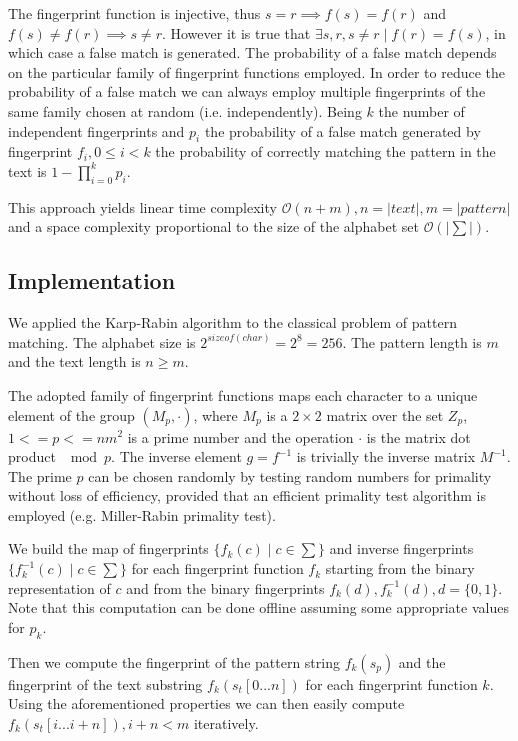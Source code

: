 \documentclass{article}
\begin{document}
The fingerprint function is injective, thus $s = r \implies f(s) = f(r)$ and $f(s) \ne f(r) \implies s \ne r$. However it is true that $\exists s, r, s \ne r \mid f(r) = f(s)$, in which case a false match is generated. The probability of a false match depends on the particular family of fingerprint functions employed. In order to reduce the probability of a false match we can always employ multiple fingerprints of the same family chosen at random (i.e. independently). Being $k$ the number of independent fingerprints and $p_i$ the probability of a false match generated by fingerprint $f_i, 0 \le i < k$ the probability of correctly matching the pattern in the text is $1 - \prod_{i = 0}^k p_i$.

This approach yields linear time complexity $\mathcal{O}(n + m), n = |text|, m = |pattern|$ and a space complexity proportional to the size of the alphabet set $\mathcal{O}(|\sum|)$.

\subsection{Implementation}
We applied the Karp-Rabin algorithm to the classical problem of pattern matching. The alphabet size is $2^{sizeof(char)} = 2^8 = 256$. The pattern length is $m$ and the text length is $n \ge m$.

The adopted family of fingerprint functions maps each character to a unique element of the group $(M_p, \cdot)$, where $M_p$ is a $2 \times 2$ matrix over the set $Z_p$, $1 <= p <= n m^2$ is a prime number and the operation $\cdot$ is the matrix dot product $\mod p$. The inverse element $g = f^{-1}$ is trivially the inverse matrix $M^{-1}$. The prime $p$ can be chosen randomly by testing random numbers for primality without loss of efficiency, provided that an efficient primality test algorithm is employed (e.g. Miller-Rabin primality test).

We build the map of fingerprints $\{f_k(c) \mid c \in \sum\}$ and inverse fingerprints $\{f_k^{-1}(c) \mid c \in \sum\}$ for each fingerprint function $f_k$ starting from the binary representation of $c$ and from the binary fingerprints $f_k(d), f_k^{-1}(d), d = \{0, 1\}$. Note that this computation can be done offline assuming some appropriate values for $p_k$.

Then we compute the fingerprint of the pattern string $f_k(s_p)$ and the fingerprint of the text substring $f_k(s_t[0 ... n])$ for each fingerprint function $k$. Using the aforementioned properties we can then easily compute $f_k(s_t[i ... i + n]), i + n < m$ iteratively.
\end{document}
